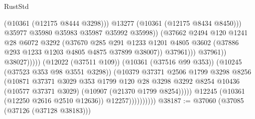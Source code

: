 \begin{lexlean}{RustStd}
\begin{coremodule}
                                                    (@10361 (@12175 @8444 @3298)))
                                                  @13277
                                                  (@10361 (@12175 @8434 @8450)))
                                                @35977
                                                @35980
                                                @35983
                                                @35987
                                                @35992
                                                @35998))
                                            (@37662
                                              @2494
                                              @120
                                              @1241
                                              @28
                                              @6072
                                              @3292
                                              (@37670
                                                @285
                                                @291
                                                @1233
                                                @1201
                                                @4805
                                                @3602
                                                (@37886 @293 @1233 @1203 @4805 @4875 @37899 @38007))
                                              @37961)))
                                        @37961))
                                    @38027)))))
                          (@12022 (@37511 @109))
                          (@10361 (@37516 @99 @353))
                          (@10245 (@37523 @353 @98 @3551 @3298))
                          (@10379
                            @37371
                            @2506
                            @1799
                            @3298
                            @8256
                            (@10871
                              @37371
                              @3029
                              @353
                              @1799
                              @120
                              @28
                              @3298
                              @3292
                              @8254
                              @10436
                              (@10577 @37371 @3029)
                              (@10907 (@21370 @1799 @8254)))))
                        @12245
                        (@10361 (@12250 @2616 @2510 @12636))
                        @12257))))))))))
@38187 := @37060 (@37085 (@37126 (@37128 @38183)))

\end{coremodule}
\end{lexlean}
